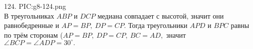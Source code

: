 124. {{PIC:g8-124.png}}\\
В треугольниках $ABP$ и $DCP$ медиана совпадает с высотой, значит они равнобедренные и $AP=BP,\ DP=CP.$ Тогда треугольники $APD$ и $BPC$ равны по трём сторонам ($AP=BP,\ DP=CP,\ BC=AD,$ значит $\angle BCP=\angle ADP=30^\circ.$\\
